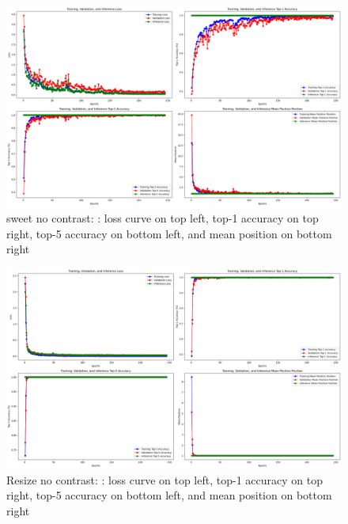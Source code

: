 \begin{figure}[H]
  \centering
  \includegraphics[scale=0.3]{figures/sweet_no_contra.png} 
  \caption{sweet no contrast: : loss curve on top left, top-1 accuracy on top right, top-5 accuracy on bottom left, and mean position on bottom right}
  \label{fig:sweet_no_contra}
\end{figure}

\vspace{-5mm} %

\begin{figure}[H]
  \centering
  \includegraphics[scale=0.3]{figures/Resize_No_contra.png} 
  \caption{Resize no contrast: : loss curve on top left, top-1 accuracy on top right, top-5 accuracy on bottom left, and mean position on bottom right}
  \label{fig:Resize_No_contra_b64}
\end{figure}

\vspace{-5mm} %

